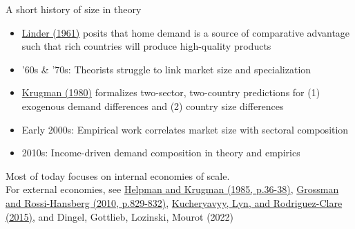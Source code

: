\documentclass[10pt,notes=hide]{beamer}
\begin{document}
\begin{frame}{A short history of size in theory}
\begin{itemize}
	\item \href{https://books.google.com/books?id=fJM_cAAACAAJ}{Linder (1961)} posits that home demand is a source of comparative advantage such that rich countries will produce high-quality products
	\item '60s \& '70s: Theorists struggle to link market size and specialization
	\item \href{https://assets.aeaweb.org/assets/production/journals/aer/top20/70.5.950-959.pdf}{Krugman (1980)} formalizes two-sector, two-country predictions for (1) exogenous demand differences and (2) country size differences
	\item Early 2000s: Empirical work correlates market size with sectoral composition
	\item 2010s: Income-driven demand composition in theory and empirics
\end{itemize}
Most of today focuses on internal economies of scale.\\
For external economies, see \href{https://mitpress.mit.edu/books/market-structure-and-foreign-trade}{Helpman and Krugman (1985, p.36-38)}, \href{http://qje.oxfordjournals.org/content/125/2/829.abstract}{Grossman and Rossi-Hansberg (2010, p.829-832)}, \href{http://eml.berkeley.edu/~arodeml/}{Kucheryavyy, Lyn, and Rodriguez-Clare (2015)},
and Dingel, Gottlieb, Lozinski, Mourot (2022)
\end{frame}
\end{document}
